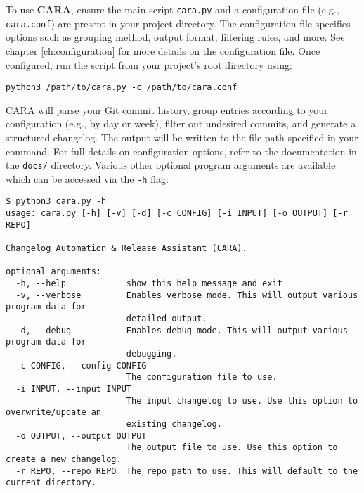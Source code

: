 To use \textbf{CARA}, ensure the main script \texttt{cara.py} and a configuration file (e.g., \texttt{cara.conf}) are present in your project directory. The configuration file specifies options such as grouping method, output format, filtering rules, and more. See chapter \ref{ch:configuration} for more details on the configuration file. Once configured, run the script from your project's root directory using:
\begin{lstlisting}[style=terminalstyle]
python3 /path/to/cara.py -c /path/to/cara.conf
\end{lstlisting}
CARA will parse your Git commit history, group entries according to your configuration (e.g., by day or week), filter out undesired commits, and generate a structured changelog. The output will be written to the file path specified in your command. For full details on configuration options, refer to the documentation in the \texttt{docs/} directory. Various other optional program arguments are available which can be accessed via the \texttt{-h} flag:
\begin{lstlisting}[style=terminalstyle]
$ python3 cara.py -h
usage: cara.py [-h] [-v] [-d] [-c CONFIG] [-i INPUT] [-o OUTPUT] [-r REPO]

Changelog Automation & Release Assistant (CARA).

optional arguments:
  -h, --help            show this help message and exit
  -v, --verbose         Enables verbose mode. This will output various program data for
                        detailed output.
  -d, --debug           Enables debug mode. This will output various program data for
                        debugging.
  -c CONFIG, --config CONFIG
                        The configuration file to use.
  -i INPUT, --input INPUT
                        The input changelog to use. Use this option to overwrite/update an
                        existing changelog.
  -o OUTPUT, --output OUTPUT
                        The output file to use. Use this option to create a new changelog.
  -r REPO, --repo REPO  The repo path to use. This will default to the current directory.
\end{lstlisting}